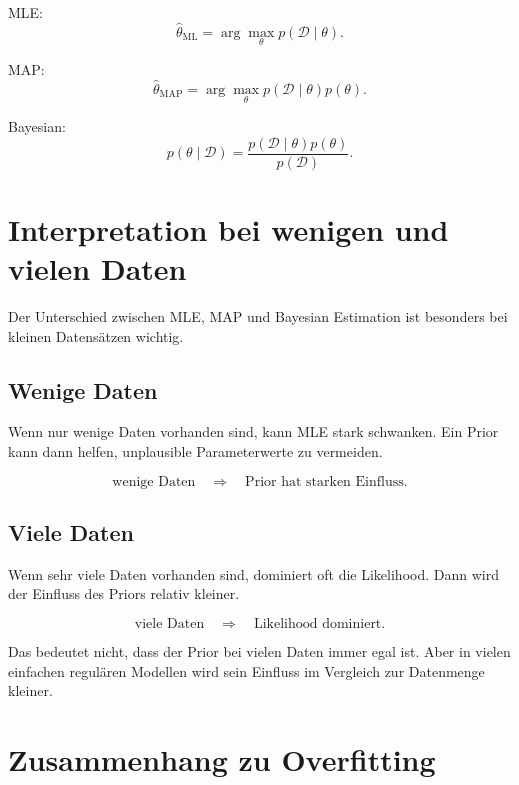 \begin{conceptbox}
MLE:
\[
    \hat{\theta}_{\mathrm{ML}}
    =
    \arg\max_{\theta}
    p(\mathcal{D}\mid\theta).
\]

MAP:
\[
    \hat{\theta}_{\mathrm{MAP}}
    =
    \arg\max_{\theta}
    p(\mathcal{D}\mid\theta)p(\theta).
\]

Bayesian:
\[
    p(\theta\mid\mathcal{D})
    =
    \frac{
        p(\mathcal{D}\mid\theta)p(\theta)
    }{
        p(\mathcal{D})
    }.
\]
\end{conceptbox}

\section{Interpretation bei wenigen und vielen Daten}

Der Unterschied zwischen MLE, MAP und Bayesian Estimation ist besonders bei kleinen Datensätzen wichtig.

\subsection{Wenige Daten}

Wenn nur wenige Daten vorhanden sind, kann MLE stark schwanken.
Ein Prior kann dann helfen, unplausible Parameterwerte zu vermeiden.

\[
    \text{wenige Daten}
    \quad
    \Rightarrow
    \quad
    \text{Prior hat starken Einfluss}.
\]

\subsection{Viele Daten}

Wenn sehr viele Daten vorhanden sind, dominiert oft die Likelihood.
Dann wird der Einfluss des Priors relativ kleiner.

\[
    \text{viele Daten}
    \quad
    \Rightarrow
    \quad
    \text{Likelihood dominiert}.
\]

\begin{notebox}
Das bedeutet nicht, dass der Prior bei vielen Daten immer egal ist.
Aber in vielen einfachen regulären Modellen wird sein Einfluss im Vergleich zur Datenmenge kleiner.
\end{notebox}

\section{Zusammenhang zu Overfitting}

